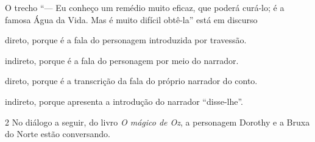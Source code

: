 \begin{conteudo}
\begin{conteudo}
\begin{conteudo}
\begin{conteudo}
\begin{conteudo}

O trecho ``--- Eu conheço um remédio muito eficaz, que poderá curá-lo; é a
famosa Água da Vida. Mas é muito difícil obtê-la'' está em discurso

\begin{escolha}
\item direto, porque é a fala do personagem introduzida por travessão.

\item indireto, porque é a fala do personagem por meio do narrador.

\item direto, porque é a transcrição da fala do próprio narrador do conto.

\item indireto, porque apresenta a introdução do narrador ``disse-lhe''.
\end{escolha}

\num{2} No diálogo a seguir, do livro \textit{O mágico de Oz}, a personagem
Dorothy e a Bruxa do Norte estão conversando.

\end{conteudo}
\end{conteudo}
\end{conteudo}
\end{conteudo}
\end{conteudo}
